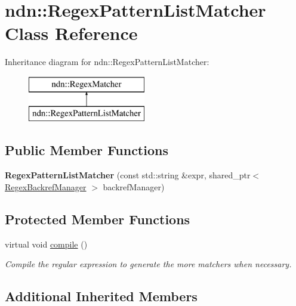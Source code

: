 \hypertarget{classndn_1_1RegexPatternListMatcher}{}\section{ndn\+:\+:Regex\+Pattern\+List\+Matcher Class Reference}
\label{classndn_1_1RegexPatternListMatcher}
Inheritance diagram for ndn\+:\+:Regex\+Pattern\+List\+Matcher\+:\begin{figure}[H]
\begin{center}
\leavevmode
\includegraphics[height=2.000000cm]{classndn_1_1RegexPatternListMatcher}
\end{center}
\end{figure}
\subsection*{Public Member Functions}
\begin{DoxyCompactItemize}
\item 
{\bfseries Regex\+Pattern\+List\+Matcher} (const std\+::string \&expr, shared\+\_\+ptr$<$ \hyperlink{classndn_1_1RegexBackrefManager}{Regex\+Backref\+Manager} $>$ backref\+Manager)\hypertarget{classndn_1_1RegexPatternListMatcher_aa0e1561d482651b4d7375463d17d3b45}{}\label{classndn_1_1RegexPatternListMatcher_aa0e1561d482651b4d7375463d17d3b45}

\end{DoxyCompactItemize}
\subsection*{Protected Member Functions}
\begin{DoxyCompactItemize}
\item 
virtual void \hyperlink{classndn_1_1RegexPatternListMatcher_a7dfd26ca9fedfe724d320c4bb04ccd35}{compile} ()
\begin{DoxyCompactList}\small\item\em Compile the regular expression to generate the more matchers when necessary. \end{DoxyCompactList}\end{DoxyCompactItemize}
\subsection*{Additional Inherited Members}


